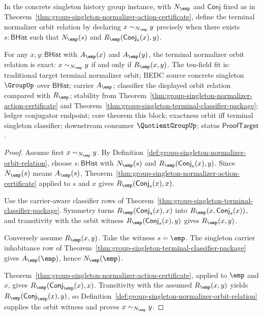 \begin{definition}
\label{def:group-singleton-normalizer-orbit-relation}
In the concrete singleton history group instance, with $N_{\emp}$ and
$\mathsf{Conj}$ fixed as in
Theorem~\ref{thm:group-singleton-normalizer-action-certificate}, define the
terminal normalizer orbit relation by declaring
$x\sim_{N_{\emp}}y$ precisely when there exists $s:\mathsf{BHist}$ such that
$N_{\emp}(s)$ and $R_{\emp}(\mathsf{Conj}_s(x),y)$.
\end{definition}

\begin{theorem}
\label{thm:group-singleton-normalizer-orbit-exactness}
For any $x,y:\mathsf{BHist}$ with $A_{\emp}(x)$ and $A_{\emp}(y)$, the
terminal normalizer orbit relation is exact:
$x\sim_{N_{\emp}}y$ if and only if $R_{\emp}(x,y)$. The ten-field fit is:
traditional target terminal normalizer orbit; BEDC source concrete singleton
$\GroupUp$ over $\mathsf{BHist}$; carrier $A_{\emp}$; classifier the displayed
orbit relation compared with $R_{\emp}$; stability from
Theorem~\ref{thm:group-singleton-normalizer-action-certificate} and
Theorem~\ref{thm:group-singleton-terminal-classifier-package}; ledger
conjugator endpoint; core theorem this block; exactness orbit iff terminal
singleton classifier; downstream consumer $\QuotientGroupUp$; status
$\mathsf{ProofTarget}$.
\end{theorem}
\begin{proof}
Assume first $x\sim_{N_{\emp}}y$. By
Definition~\ref{def:group-singleton-normalizer-orbit-relation}, choose
$s:\mathsf{BHist}$ with $N_{\emp}(s)$ and
$R_{\emp}(\mathsf{Conj}_s(x),y)$. Since $N_{\emp}(s)$ means
$A_{\emp}(s)$, Theorem~\ref{thm:group-singleton-normalizer-action-certificate}
applied to $s$ and $x$ gives
$R_{\emp}(\mathsf{Conj}_s(x),x)$.

Use the carrier-aware classifier rows of
Theorem~\ref{thm:group-singleton-terminal-classifier-package}. Symmetry turns
$R_{\emp}(\mathsf{Conj}_s(x),x)$ into
$R_{\emp}(x,\mathsf{Conj}_s(x))$, and transitivity with the orbit witness
$R_{\emp}(\mathsf{Conj}_s(x),y)$ gives $R_{\emp}(x,y)$.

Conversely assume $R_{\emp}(x,y)$. Take the witness $s=\emp$. The singleton
carrier inhabitance row of
Theorem~\ref{thm:group-singleton-terminal-classifier-package} gives
$A_{\emp}(\emp)$, hence $N_{\emp}(\emp)$.

Theorem~\ref{thm:group-singleton-normalizer-action-certificate}, applied to
$\emp$ and $x$, gives $R_{\emp}(\mathsf{Conj}_{\emp}(x),x)$. Transitivity
with the assumed $R_{\emp}(x,y)$ yields
$R_{\emp}(\mathsf{Conj}_{\emp}(x),y)$, so
Definition~\ref{def:group-singleton-normalizer-orbit-relation} supplies the
orbit witness and proves $x\sim_{N_{\emp}}y$.
\end{proof}

